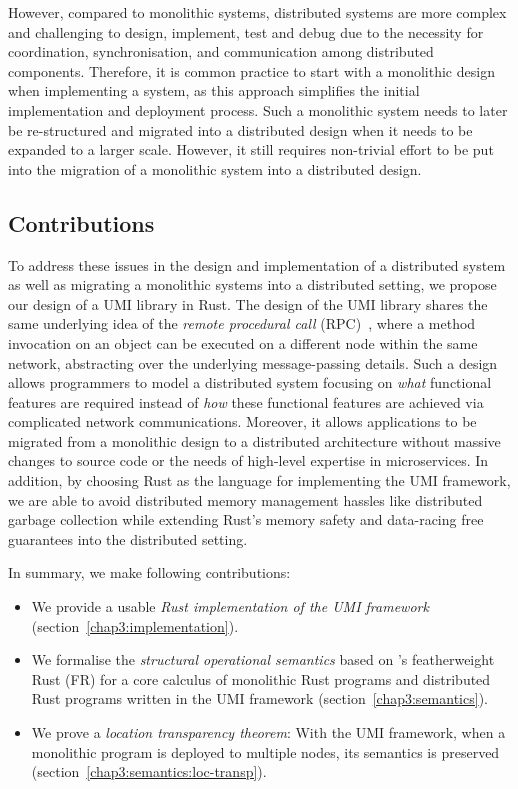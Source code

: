 However, compared to monolithic systems, distributed systems are more complex and challenging to design, implement, test and debug due to the necessity for coordination, synchronisation, and communication among distributed components. Therefore, it is common practice to start with a monolithic design when implementing a system, as this approach simplifies the initial implementation and deployment process. Such a monolithic system needs to later be re-structured and migrated into a distributed design when it needs to be expanded to a larger scale. However, it still requires non-trivial effort to be put into the migration of a monolithic system into a distributed design.

\subsection{Contributions}
To address these issues in the design and implementation of a distributed system as well as migrating a monolithic systems into a distributed setting, we propose our design of a UMI library in Rust. The design of the UMI library shares the same underlying idea of the \emph{remote procedural call} (RPC)~\citep{10.5555/910306}, where a method invocation on an object can be executed on a different node within the same network, abstracting over the underlying message-passing details. Such a design allows programmers to model a distributed system focusing on \emph{what} functional features are required instead of \emph{how} these functional features are achieved via complicated network communications. Moreover, it allows applications to be migrated from a monolithic design to a distributed architecture without massive changes to source code or the needs of high-level expertise in microservices. In addition, by choosing Rust as the language for implementing the UMI framework, we are able to avoid distributed memory management hassles like distributed garbage collection while extending Rust's memory safety and data-racing free guarantees into the distributed setting.

In summary, we make following contributions:
\begin{itemize}
    \item We provide a usable \emph{Rust implementation of the UMI framework} (section~\ref{chap3:implementation}).
    \item We formalise the \emph{structural operational semantics} based on \citet{10.1145/3443420}'s featherweight Rust (FR) for a core calculus of monolithic Rust programs and distributed Rust programs written in the UMI framework (section~\ref{chap3:semantics}).
    \item We prove a \emph{location transparency theorem}: With the UMI framework, when a monolithic program is deployed to multiple nodes, its semantics is preserved (section~\ref{chap3:semantics:loc-transp}).
\end{itemize}

